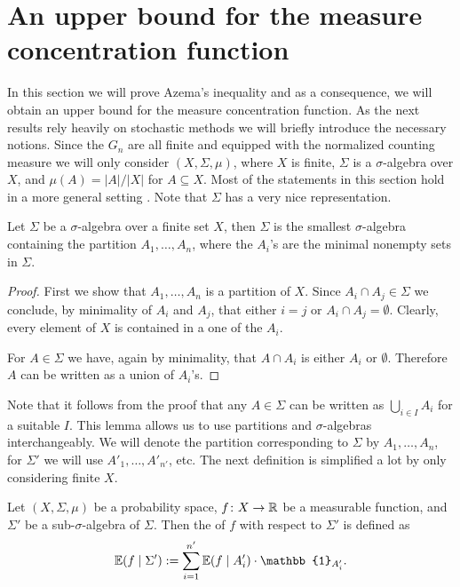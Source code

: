 \section{An upper bound for the measure concentration function}
In this section we will prove Azema's inequality and as a consequence, we will obtain an upper bound for the measure concentration function. As the next results rely heavily on stochastic methods we will briefly introduce the necessary notions. Since the $G_n$ are all finite and equipped with the normalized counting measure we will only consider  $(X,\Sigma,\mu)$, where $X$ is finite, $\Sigma$ is a $\sigma$-algebra over $X$, and $\mu(A)=|A|/|X|$ for $A\subseteq X$. Most of the statements in this section hold in a more general setting \cite{azema}. Note that $\Sigma$ has a very nice representation.%

\begin{lemma}
Let $\Sigma$ be a $\sigma$-algebra over a finite set $X$, then $\Sigma$ is the smallest $\sigma$-algebra containing the partition $A_1,\dots,A_n$, where the $A_i$'s are the minimal nonempty sets in $\Sigma$.
\end{lemma}
\begin{proof}
First we show that $A_1,\dots,A_n$ is a  partition of $X$. Since $A_i\cap A_j\in\Sigma$ we conclude, by minimality of $A_i$ and $A_j$, that either $i=j$ or $A_i\cap A_j=\emptyset$. Clearly, every element of $X$ is contained in a one of the $A_i$. 

For $A\in\Sigma$ we have, again by minimality, that $A\cap A_i$ is either $A_i$ or $\emptyset$. Therefore $A$ can be written as a union of $A_i$'s.
\end{proof}
Note that it follows from the proof that any $A\in\Sigma$ can be written as $\bigcup_{i\in I}A_i$ for a suitable $I$. This lemma allows us to use partitions and $\sigma$-algebras interchangeably. We will denote the partition corresponding to $\Sigma$ by $A_1,\dots,A_n$, for $\Sigma'$ we will use $A'_1,\dots,A'_{n'}$, etc. The next definition is simplified a lot by only considering finite $X$.

\begin{definition}
Let $(X,\Sigma,\mu)$ be a probability space, $f\colon X\to \mathbb{R}$ be a measurable function, and $\Sigma'$ be a sub-$\sigma$-algebra of $\Sigma$. Then the  of $f$ with respect to $\Sigma'$ is defined as
\[\E(f\mid \Sigma'):=\sum_{i=1}^{n'}\E(f\mid A'_i)\cdot \mathbb{1}_{A'_i}.\]
\end{definition}

